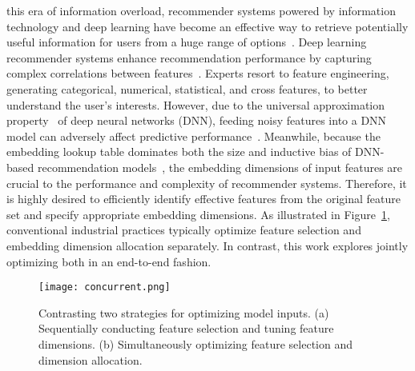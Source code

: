 \documentclass[10pt,journal,compsoc]{IEEEtran}
\begin{document}


 this era of information overload, recommender systems powered by information technology and deep learning have become an effective way to retrieve potentially useful information for users from a huge range of options~\cite{pazzani2007content,chen2022clcdr,chen2023cdr}.
Deep learning recommender systems enhance recommendation performance by capturing complex correlations between features~\cite{autocross}.
Experts resort to feature engineering, generating categorical, numerical, statistical, and cross features, to better understand the user's interests.
However, due to the universal approximation property~\cite{hornik1989multilayer} of deep neural networks (DNN), feeding noisy features into a DNN model can adversely affect predictive performance~\cite{autocross,muthusankar2019high}.
Meanwhile, because the embedding lookup table dominates both the size and inductive bias of DNN-based recommendation models~\cite{cheng2020differentiable}, the embedding dimensions of input features are crucial to the performance and complexity of recommender systems.
Therefore, it is highly desired to efficiently identify effective features from the original feature set and specify appropriate embedding dimensions.
{As illustrated in Figure~\ref{fig:optima}, conventional industrial practices typically optimize feature selection and embedding dimension allocation separately. In contrast, this work explores jointly optimizing both in an end-to-end fashion. }

\begin{figure}[t!]
    \centering
    \texttt{[image: concurrent.png]}
    \caption{{Contrasting two strategies for optimizing model inputs. (a) Sequentially conducting feature selection and tuning feature dimensions. (b) Simultaneously optimizing feature selection and dimension allocation.}}
    \label{fig:optima}
\end{figure}
\end{document}

